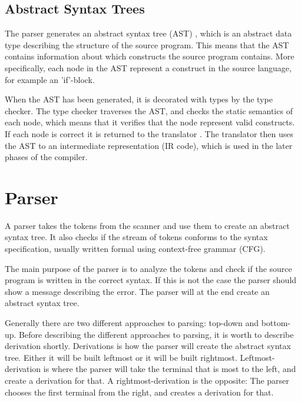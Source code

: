 \subsection{Abstract Syntax Trees}
The parser generates an abstract syntax tree (AST) \citep{CraftingACompiler}, which is an abstract data type describing the structure of the source program. This means that the AST contains information about which constructs the source program contains. More specifically, each node in the AST represent a construct in the source language, for example an 'if'-block.

When the AST has been generated, it is decorated with types by the type checker. The type checker traverses the AST, and checks the static semantics of each node, which means that it verifies that the node represent valid constructs. If each node is correct it is returned to the translator \citep{CraftingACompiler}. The translator then uses the AST to an intermediate representation (IR code), which is used in the later phases of the compiler.

\section{Parser}
A parser takes the tokens from the scanner and use them to create an abstract syntax tree. It also checks if the stream of tokens conforms to the syntax specification, usually written formal using context-free grammar (CFG).

The main purpose of the parser is to analyze the tokens and check if the source program is written in the correct syntax. If this is not the case the parser should show a message describing the error. The parser will at the end create an abstract syntax tree. 

Generally there are two different approaches to parsing: top-down and bottom-up. Before describing the different approaches to parsing, it is worth to describe derivation shortly. Derivations is how the parser will create the abstract syntax tree.
Either it will be built leftmost or it will be built rightmost. Leftmost-derivation is where the parser will take the terminal that is most to the left, and create a derivation for that. A rightmost-derivation is the opposite: The parser chooses the first terminal from the right, and creates a derivation for that.


